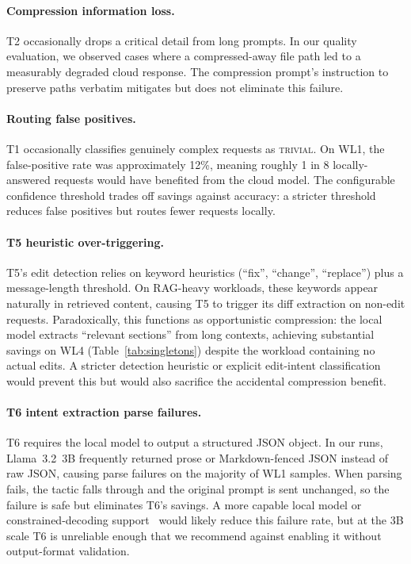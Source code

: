 \documentclass[11pt,a4paper]{article}
\begin{document}
\paragraph{Compression information loss.}
T2 occasionally drops a critical detail from long prompts. In our
quality evaluation, we observed cases where a compressed-away file path
led to a measurably degraded cloud response. The compression prompt's
instruction to preserve paths verbatim mitigates but does not eliminate
this failure.

\paragraph{Routing false positives.}
T1 occasionally classifies genuinely complex requests as
\textsc{trivial}. On WL1, the false-positive rate was approximately
12\%, meaning roughly 1 in 8 locally-answered requests would have
benefited from the cloud model. The configurable confidence threshold
trades off savings against accuracy: a stricter threshold reduces false
positives but routes fewer requests locally.

\paragraph{T5 heuristic over-triggering.}
T5's edit detection relies on keyword heuristics (``fix'', ``change'',
``replace'') plus a message-length threshold. On RAG-heavy workloads,
these keywords appear naturally in retrieved content, causing T5 to
trigger its diff extraction on non-edit requests. Paradoxically, this
functions as opportunistic compression: the local model extracts
``relevant sections'' from long contexts, achieving substantial savings
on WL4 (Table~\ref{tab:singletons}) despite the workload containing no
actual edits. A stricter detection heuristic or explicit edit-intent
classification would prevent this but would also sacrifice the
accidental compression benefit.

\paragraph{T6 intent extraction parse failures.}
T6 requires the local model to output a structured JSON object. In our
runs, Llama~3.2~3B frequently returned prose or Markdown-fenced JSON
instead of raw JSON, causing parse failures on the majority of WL1
samples. When parsing fails, the tactic falls through and the original
prompt is sent unchanged, so the failure is safe but eliminates T6's
savings. A more capable local model or constrained-decoding
support~\cite{willard2023guided} would likely reduce this failure rate,
but at the 3B scale T6 is unreliable enough that we recommend against
enabling it without output-format validation.
\end{document}
